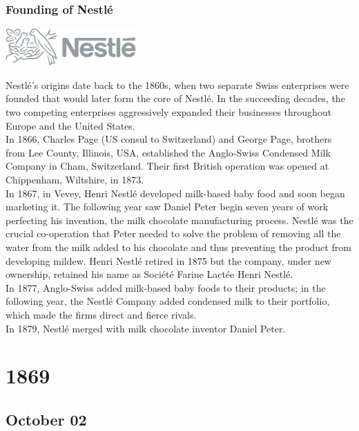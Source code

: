 \documentclass[11pt]{report}
\begin{document}
\subsection{Founding of Nestlé}
\vspace{2mm}\begin{center}\includegraphics[width=5cm]{./img/nestleLogo.jpg}\end{center}
Nestlé's origins date back to the 1860s, when two separate Swiss enterprises were founded that would later form the core of Nestlé. In the succeeding decades, the two competing enterprises aggressively expanded their businesses throughout Europe and the United States.\\
\indent In 1866, Charles Page (US consul to Switzerland) and George Page, brothers from Lee County, Illinois, USA, established the Anglo-Swiss Condensed Milk Company in Cham, Switzerland. Their first British operation was opened at Chippenham, Wiltshire, in 1873.\\
\indent In 1867, in Vevey, Henri Nestlé developed milk-based baby food and soon began marketing it. The following year saw Daniel Peter begin seven years of work perfecting his invention, the milk chocolate manufacturing process. Nestlé was the crucial co-operation that Peter needed to solve the problem of removing all the water from the milk added to his chocolate and thus preventing the product from developing mildew. Henri Nestlé retired in 1875 but the company, under new ownership, retained his name as Société Farine Lactée Henri Nestlé.\\
\indent In 1877, Anglo-Swiss added milk-based baby foods to their products; in the following year, the Nestlé Company added condensed milk to their portfolio, which made the firms direct and fierce rivals.\\ \indent In 1879, Nestlé merged with milk chocolate inventor Daniel Peter.

\chapter{1869}
\section{October 02}
\end{document}
